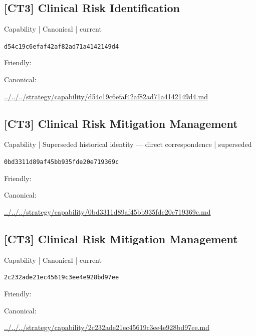 \documentclass[10pt,a4paper]{article}
\begin{document}
\subsection*{[CT3] Clinical Risk Identification}
{\small Capability | Canonical | current}\par
\texttt{d54c19c6efaf42af82ad71a4142149d4}\par
Friendly: \par
Canonical: \par
{\footnotesize\url{../../../strategy/capability/d54c19c6efaf42af82ad71a4142149d4.md}}\par
\subsection*{[CT3] Clinical Risk Mitigation Management}
{\small Capability | Superseded historical identity — direct correspondence | superseded}\par
\texttt{0bd3311d89af45bb935fde20e719369c}\par
Friendly: \par
Canonical: \par
{\footnotesize\url{../../../strategy/capability/0bd3311d89af45bb935fde20e719369c.md}}\par
\subsection*{[CT3] Clinical Risk Mitigation Management}
{\small Capability | Canonical | current}\par
\texttt{2c232ade21ec45619c3ee4e928bd97ee}\par
Friendly: \par
Canonical: \par
{\footnotesize\url{../../../strategy/capability/2c232ade21ec45619c3ee4e928bd97ee.md}}\par
\end{document}
